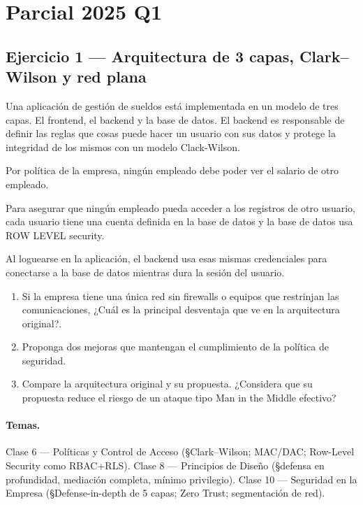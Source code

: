 \section{Parcial 2025 Q1}

\subsection{Ejercicio 1 — Arquitectura de 3 capas, Clark--Wilson y red plana}

\begin{consigna}
Una aplicación de gestión de sueldos está implementada en un modelo de tres capas. El frontend, el backend y la base de datos. El backend es responsable de definir las reglas que cosas puede hacer un usuario con sus datos y protege la integridad de los mismos con un modelo Clack-Wilson.

Por política de la empresa, ningún empleado debe poder ver el salario de otro empleado.

Para asegurar que ningún empleado pueda acceder a los registros de otro usuario, cada usuario tiene una cuenta definida en la base de datos y la base de datos usa ROW LEVEL security.

Al loguearse en la aplicación, el backend usa esas mismas credenciales para conectarse a la base de datos mientras dura la sesión del usuario.

\begin{enumerate}
  \item[a)] Si la empresa tiene una única red sin firewalls o equipos que restrinjan las comunicaciones, ¿Cuál es la principal desventaja que ve en la arquitectura original?.
  \item[b)] Proponga dos mejoras que mantengan el cumplimiento de la política de seguridad.
  \item[c)] Compare la arquitectura original y su propuesta. ¿Considera que su propuesta reduce el riesgo de un ataque tipo Man in the Middle efectivo?
\end{enumerate}
\end{consigna}

\paragraph{Temas.}
Clase 6 — Políticas y Control de Acceso (\S Clark--Wilson; MAC/DAC; Row-Level Security como RBAC+RLS). Clase 8 — Principios de Diseño (\S defensa en profundidad, mediación completa, mínimo privilegio). Clase 10 — Seguridad en la Empresa (\S Defense-in-depth de 5 capas; Zero Trust; segmentación de red).

